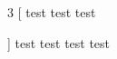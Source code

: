 \documentclass{article}
\begin{document}
    \begin{multicols}{3}
        [
            test test test

        ]
        test test test test
    \end{multicols}
\end{document}
